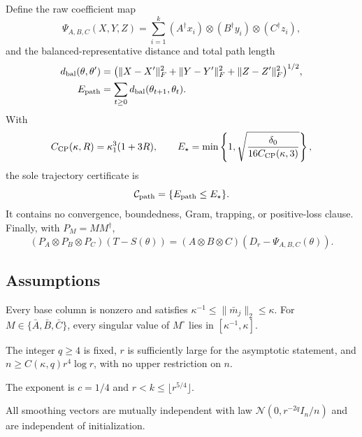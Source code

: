 Define the raw coefficient map
\[
  \Psi_{A,B,C}(X,Y,Z)
  =\sum_{i=1}^k(A^\dagger x_i)\otimes(B^\dagger y_i)
       \otimes(C^\dagger z_i),
\]
and the balanced-representative distance and total path length
\[
\begin{aligned}
 d_{\rm bal}(\theta,\theta')
 &=\bigl(\|X-X'\|_F^2+\|Y-Y'\|_F^2+\|Z-Z'\|_F^2\bigr)^{1/2},\\
 E_{\rm path}&=\sum_{t\ge0}d_{\rm bal}(\theta_{t+1},\theta_t).
\end{aligned}
\]
With
\[
  C_{\rm CP}(\kappa,R)=\kappa_1^3(1+3R),
  \qquad
  E_\star=\min\left\{1,
   \sqrt{\frac{\delta_0}{16C_{\rm CP}(\kappa,3)}}\right\},
\]
the sole trajectory certificate is
\[
  \mathcal C_{\rm path}=\{E_{\rm path}\le E_\star\}.
\]
It contains no convergence, boundedness, Gram, trapping, or positive-loss
clause.  Finally, with $P_M=MM^\dagger$,
\[
  (P_A\otimes P_B\otimes P_C)(T-S(\theta))
  =(A\otimes B\otimes C)(D_r-\Psi_{A,B,C}(\theta)).
\]

\subsection{Assumptions}

\begin{assumption}
\label{assump:base_conditioning}
Every base column is nonzero and satisfies
$\kappa^{-1}\le\|\bar m_j\|_2\le\kappa$.  For
$M\in\{\bar A,\bar B,\bar C\}$, every singular value of $M^\circ$ lies in
$[\kappa^{-1},\kappa]$.
\end{assumption}

\begin{assumption}
\label{assump:dimension}
The integer $q\ge4$ is fixed, $r$ is sufficiently large for the asymptotic
statement, and $n\ge C(\kappa,q)r^4\log r$, with no upper restriction on $n$.
\end{assumption}

\begin{assumption}
\label{assump:rank_window}
The exponent is $c=1/4$ and
$r<k\le\lfloor r^{5/4}\rfloor$.
\end{assumption}

\begin{assumption}
\label{assump:gaussian_smoothing}
All smoothing vectors are mutually independent with law
$\mathcal N(0,r^{-2q}I_n/n)$ and are independent of initialization.
\end{assumption}

